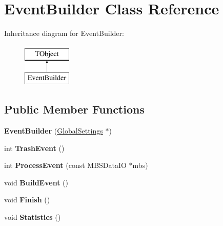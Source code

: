 \hypertarget{class_event_builder}{}\section{Event\+Builder Class Reference}
\label{class_event_builder}
Inheritance diagram for Event\+Builder\+:\begin{figure}[H]
\begin{center}
\leavevmode
\includegraphics[height=2.000000cm]{class_event_builder}
\end{center}
\end{figure}
\subsection*{Public Member Functions}
\begin{DoxyCompactItemize}
\item 
\mbox{\label{class_event_builder_ae5bc6281c66e115f92ab1aad525cc71b}} 
{\bfseries Event\+Builder} (\hyperlink{class_global_settings}{Global\+Settings} $\ast$)
\item 
\mbox{\label{class_event_builder_a19d233a535cc211f91f5de56f4c42e9c}} 
int {\bfseries Trash\+Event} ()
\item 
\mbox{\label{class_event_builder_a4e469463e20974bc7be2cfa0ab3874f5}} 
int {\bfseries Process\+Event} (const M\+B\+S\+Data\+IO $\ast$mbs)
\item 
\mbox{\label{class_event_builder_a5e3732d9c2aa0539c0e01e22ce7f5c88}} 
void {\bfseries Build\+Event} ()
\item 
\mbox{\label{class_event_builder_abcc24c43c7bcca0c9e445141349fd816}} 
void {\bfseries Finish} ()
\item 
\mbox{\label{class_event_builder_a840f7a4c8d9bb81e92007cfb19637bff}} 
void {\bfseries Statistics} ()
\end{DoxyCompactItemize}

